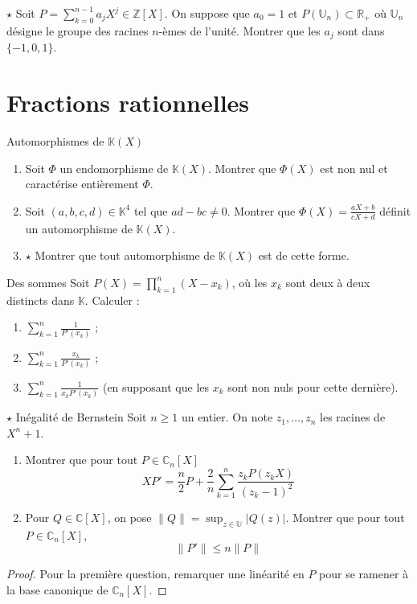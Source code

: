 \documentclass[french,a4paper]{article}
\newcommand{\Z}{\mathbb{Z}}
\newcommand{\R}{\mathbb{R}}
\newcommand{\C}{\mathbb{C}}
\newcommand{\K}{\mathbb{K}}
\newcommand{\U}{\mathbb{U}}
\theoremstyle{plain}
\theoremstyle{definition}
\theoremstyle{remark}
\begin{document}
\begin{ex}[Moulin.35]{$\star$}
	Soit $P=\displaystyle\sum_{k=0}^{n-1}a_jX^j\in\Z[X]$. On suppose que $a_0=1$ et $P(\U_n)\subset\R_+$ où $\U_n$ désigne le groupe des racines $n$-èmes de l'unité. Montrer que les $a_j$ sont dans $\{-1,0,1\}$.
\end{ex}

\section{Fractions rationnelles}

\begin{ex}[Moulin.36]{Automorphismes de $\K(X)$}
	\begin{enumerate}
		\item Soit $\Phi$ un endomorphisme de $\K(X)$. Montrer que $\Phi(X)$ est non nul et caractérise entièrement $\Phi$.
		\item Soit $(a,b,c,d)\in\K^4$ tel que $ad-bc\ne 0$. Montrer que $\Phi(X)=\displaystyle\frac{aX+b}{cX+d}$ définit un automorphisme de $\K(X)$.
		\item $\star$ Montrer que tout automorphisme de $\K(X)$ est de cette forme.
	\end{enumerate}
\end{ex}

\begin{ex}[Moulin.37]{Des sommes}
	Soit $P(X)=\displaystyle\prod_{k=1}^{n}(X-x_k)$, où les $x_k$ sont deux à deux distincts dans $\K$. Calculer : 
	\begin{enumerate}
		\item $\displaystyle\sum_{k=1}^{n}\frac{1}{P'(x_k)}$ ;
		\item $\displaystyle\sum_{k=1}^{n}\frac{x_k}{P'(x_k)}$ ;
		\item $\displaystyle\sum_{k=1}^{n}\frac{1}{x_kP'(x_k)}$ (en supposant que les $x_k$ sont non nuls pour cette dernière).
	\end{enumerate}
\end{ex}

\begin{ex}[Moulin.38]{$\star$ Inégalité de Bernstein}
	Soit $n\geqslant 1$ un entier. On note $z_1,\ldots,z_n$ les racines de $X^n+1$.
	\begin{enumerate}
		\item Montrer que pour tout $P\in\C_n[X]$ $$XP'=\frac{n}{2}P+\frac{2}{n}\sum_{k=1}^{n}\frac{z_kP(z_kX)}{(z_k-1)^2}$$
		\item Pour $Q\in\C[X]$, on pose $\lVert Q\rVert=\displaystyle\sup_{z\in\U}\lvert Q(z)\rvert$. Montrer que pour tout $P\in\C_n[X]$, $$\lVert P'\rVert\leqslant n\lVert P\rVert$$
	\end{enumerate}
\end{ex}
\begin{proof}
	Pour la première question, remarquer une linéarité en $P$ pour se ramener à la base canonique de $\C_n[X]$.
\end{proof}
\end{document}
